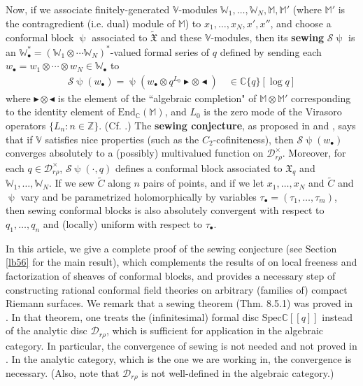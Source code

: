 \documentclass[12pt,a4paper,notitlepage]{article}
\theoremstyle{definition}
\theoremstyle{plain}
\newcommand{\fk}{\mathfrak}
\newcommand{\mc}{\mathcal}
\newcommand{\wtd}{\widetilde}
\newcommand{\End}{\mathrm{End}} %
\newcommand{\mbb}{\mathbb}
\newcommand{\blt}{\bullet}
\newcommand{\Vbb}{\mathbb V}
\newcommand{\Wbb}{\mathbb W}
\newcommand{\Mbb}{\mathbb M}
\newcommand{\Cbb}{\mathbb C}
\newcommand{\Zbb}{\mathbb Z}
\newcommand{\btl}{\blacktriangleleft}
\newcommand{\btr}{\blacktriangleright}
\numberwithin{equation}{section}
\begin{document}
Now, if we associate finitely-generated $\Vbb$-modules $\Wbb_1,\dots,\Wbb_N,\Mbb,\Mbb'$ (where $\Mbb'$ is the contragredient (i.e. dual) module of $\Mbb$) to $x_1,\dots,x_N,x',x''$, and choose a conformal block $\uppsi$ associated to $\wtd{\fk X}$ and these $\Vbb$-modules, then its \textbf{sewing} $\mc S\uppsi$ is an $\Wbb_\blt^*=(\Wbb_1\otimes\cdots\Wbb_N)^*$-valued formal series of $q$ defined by sending each $w_\blt=w_1\otimes\cdots\otimes w_N\in\Wbb_\blt$ to
\begin{align*}
\mc S\uppsi(w_\blt)=\uppsi(w_\blt\otimes q^{L_0}\btr\otimes\btl)\quad\in\Cbb\{q\}[\log q]
\end{align*}
where $\btr\otimes\btl$ is the element of the ``algebraic completion" of $\Mbb\otimes\Mbb'$ corresponding to the identity element of $\End_\Cbb(\Mbb)$, and $L_0$ is the zero mode of the Virasoro operators $\{L_n:n\in\Zbb\}$. (Cf. \cite{Seg88,Vafa87,TUY89,Hua97,DGT19b}.) The \textbf{sewing conjecture}, as proposed in \cite[Conj. 8.1]{Zhu94} and \cite[Problem 2.2]{Hua16}, says that if $\Vbb$ satisfies nice properties (such as the $C_2$-cofiniteness), then $\mc S\uppsi(w_\blt)$ converges absolutely to a (possibly) multivalued function on $\mc D_{r\rho}^\times$. Moreover, for each $q\in\mc D_{r\rho}^\times$, $\mc S\uppsi(\cdot,q)$ defines a conformal block associated to $\fk X_q$ and $\Wbb_1,\dots,\Wbb_N$. If we sew $\wtd C$ along $n$ pairs of points, and if we let  $x_1,\dots,x_N$ and  $\wtd C$ and $\uppsi$    vary and be parametrized holomorphically by variables $\tau_\blt=(\tau_1,\dots,\tau_m)$, then  sewing  conformal blocks is also absolutely  convergent with respect to $q_1,\dots,q_n$ and (locally) uniform with respect to $\tau_\blt$. 

In this article, we give a complete proof of the sewing conjecture (see Section \ref{lb56} for the main result), which complements the results of \cite{DGT19b} on local freeness and factorization of sheaves of conformal blocks, and provides a necessary step of constructing rational conformal field theories on arbitrary (families of) compact Riemann surfaces. We remark that a sewing theorem (Thm. 8.5.1) was proved in \cite{DGT19b}. In that theorem, one treats the (infinitesimal) formal disc $\mathrm{Spec}\mbb C[[q]]$ instead of the analytic disc $\mc D_{r\rho}$, which is sufficient for application  in the algebraic category.  In particular, the convergence of sewing is not needed and not proved in \cite{DGT19b}. In the analytic category, which is the one we are working in, the convergence is necessary. (Also, note  that $\mc D_{r\rho}$ is not well-defined in the algebraic category.) %
\end{document}
